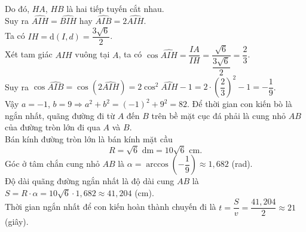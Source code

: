 \begin{ex}
{\begin{itemchoice}
			Do đó, $HA$, $HB$ là hai tiếp tuyến cắt nhau.\\
			Suy ra $\widehat{AIH} = \widehat{BIH}$ hay $\widehat{AIB} = 2\widehat{AIH}$.\\
			Ta có $IH = \mathrm{d}(I,d) = \dfrac{3\sqrt{6}}{2}$.\\
			Xét tam giác $AIH$ vuông tại $A$, ta có $\cos \widehat{AIH} = \dfrac{IA}{IH} = \dfrac{\sqrt{6}}{\dfrac{3\sqrt{6}}{2}} = \dfrac{2}{3}$.\\
			Suy ra $\cos \widehat{AIB} = \cos \left(2\widehat{AIH}\right) = 2\cos^2\widehat{AIH} - 1 = 2 \cdot \left(\dfrac{2}{3}\right)^2 - 1 = -\dfrac{1}{9}$.\\
			Vậy $a=-1$, $b=9 \Rightarrow a^2+b^2 = (-1)^2+9^2 = 82$.
			\itemch Để thời gian con kiến bò là ngắn nhất, quãng đường đi từ $A$ đến $B$ trên bề mặt cục đá phải là cung nhỏ $AB$ của đường tròn lớn đi qua $A$ và $B$.\\
			Bán kính đường tròn lớn là bán kính mặt cầu
			$$R=\sqrt{6} \text{ dm} = 10\sqrt{6} \text{ cm}.$$
			Góc ở tâm chắn cung nhỏ $AB$ là $\alpha = \arccos\left(-\dfrac{1}{9}\right) \approx 1{,}682$ (rad).\\
			Độ dài quãng đường ngắn nhất là độ dài cung $AB$ là $S = R \cdot \alpha = 10\sqrt{6} \cdot 1{,}682 \approx 41{,}204$ (cm).\\
			Thời gian ngắn nhất để con kiến hoàn thành chuyến đi là $t = \dfrac{S}{v} = \dfrac{41{,}204}{2} \approx 21$ (giây).
		\end{itemchoice}
	}
\end{ex}

